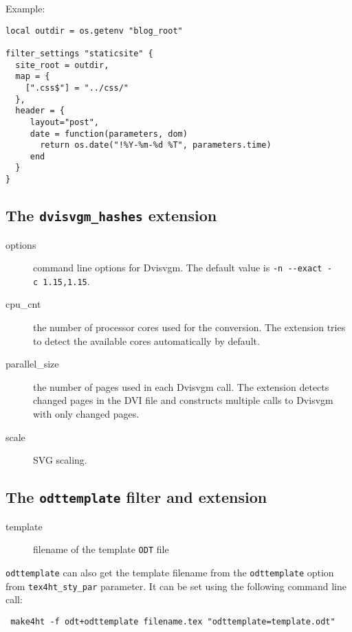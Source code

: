 Example:

\begin{verbatim}
local outdir = os.getenv "blog_root" 

filter_settings "staticsite" {
  site_root = outdir, 
  map = {
    [".css$"] = "../css/"
  },
  header = {
     layout="post",
     date = function(parameters, dom)
       return os.date("!%Y-%m-%d %T", parameters.time)
     end
  }
}
\end{verbatim}

\hypertarget{the-dvisvgm_hashes-extension}{%
\subsection{\texorpdfstring{The \texttt{dvisvgm\_hashes}
extension}{The dvisvgm\_hashes extension}}\label{the-dvisvgm_hashes-extension}}

\begin{description}
\item[options]
command line options for Dvisvgm. The default value is
\texttt{-n\ -\/-exact\ -c\ 1.15,1.15}.
\item[cpu\_cnt]
the number of processor cores used for the conversion. The extension
tries to detect the available cores automatically by default.
\item[parallel\_size]
the number of pages used in each Dvisvgm call. The extension detects
changed pages in the DVI file and constructs multiple calls to Dvisvgm
with only changed pages.
\item[scale]
SVG scaling.
\end{description}

\hypertarget{the-odttemplate-filter-and-extension}{%
\subsection{\texorpdfstring{The \texttt{odttemplate} filter and
extension}{The odttemplate filter and extension}}\label{the-odttemplate-filter-and-extension}}

\begin{description}
\item[template]
filename of the template \texttt{ODT} file
\end{description}

\texttt{odttemplate} can also get the template filename from the
\texttt{odttemplate} option from \texttt{tex4ht\_sty\_par} parameter. It
can be set using the following command line call:

\begin{verbatim}
 make4ht -f odt+odttemplate filename.tex "odttemplate=template.odt"
\end{verbatim}

